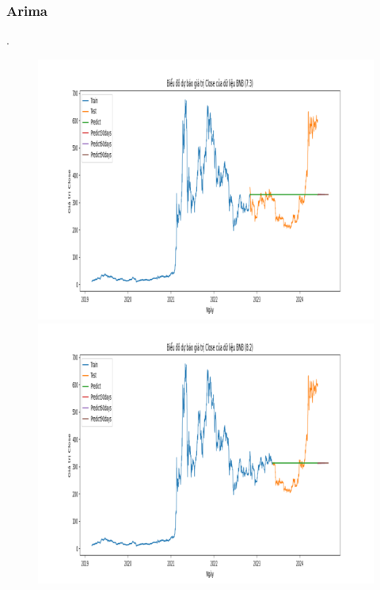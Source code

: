 \documentclass[conference]{IEEEtran}
\begin{document}
\subsubsection{Arima}.
\begin{figure}[H]
    \centering
    \begin{minipage}{0.15\textwidth}
    \centering
    \includegraphics[width=1\textwidth]{Figure/ARIMA_BNB_73.png}
    \end{minipage}
    \hfill
    \begin{minipage}{0.15\textwidth}
    \centering
    \includegraphics[width=1\textwidth]{Figure/ARIMA_BNB_82.png}
    \end{minipage}

\end{figure}
\end{document}
